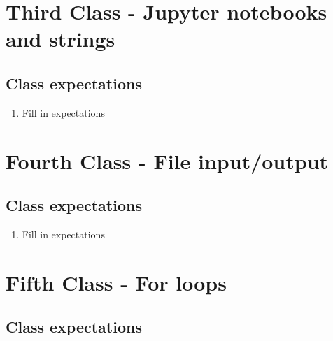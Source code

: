 \documentclass[paper=a4, fontsize=11pt]{scrartcl} %
\numberwithin{equation}{section} %
\numberwithin{figure}{section} %
\numberwithin{table}{section} %
\begin{document}
\section{Third Class - Jupyter notebooks and strings}



\subsection{Class expectations}

\begin{enumerate}
\item Fill in expectations
\end{enumerate}


\section{Fourth Class - File input/output}


\subsection{Class expectations}

\begin{enumerate}
\item Fill in expectations
\end{enumerate}


\section{Fifth Class - For loops}


\subsection{Class expectations}
\end{document}
